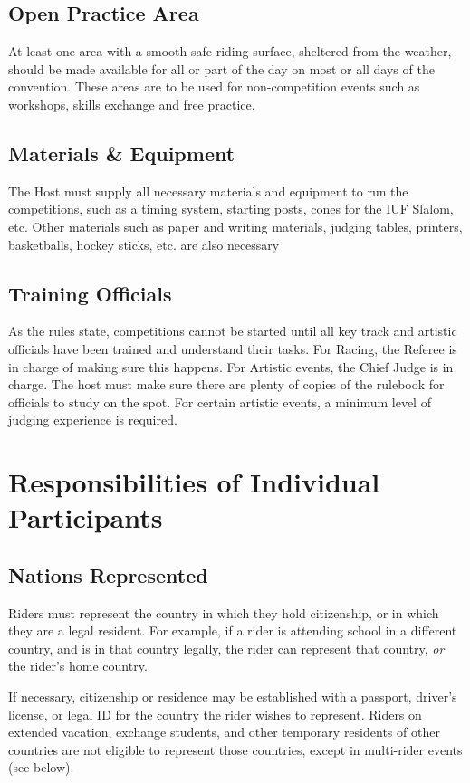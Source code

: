 \section{Open Practice Area}
At least one area with a smooth safe riding surface, sheltered from the weather, should be made available for all or part of the day on most or all days of the convention.
These areas are to be used for non-competition events such as workshops, skills exchange and free practice.

\section{Materials \& Equipment}
The Host must supply all necessary materials and equipment to run the competitions, such as a timing system, starting posts, cones for the IUF Slalom, etc.
Other materials such as paper and writing materials, judging tables, printers, basketballs, hockey sticks, etc. are also necessary 

\section{Training Officials}
As the rules state, competitions cannot be started until all key track and artistic officials have been trained and understand their tasks.
For Racing, the Referee is in charge of making sure this happens.
For Artistic events, the Chief Judge is in charge.
The host must make sure there are plenty of copies of the rulebook for officials to study on the spot.
For certain artistic events, a minimum level of judging experience is required.

\chapter{Responsibilities of Individual Participants}
\section{Nations Represented}
Riders must represent the country in which they hold citizenship, or in which they are a legal resident.
For example, if a rider is attending school in a different country, and is in that country legally, the rider can represent that country, \textit{or} the rider's home country.

If necessary, citizenship or residence may be established with a passport, driver's license, or legal ID for the country the rider wishes to represent.
Riders on extended vacation, exchange students, and other temporary residents of other countries are not eligible to represent those countries, except in multi-rider events (see below).

